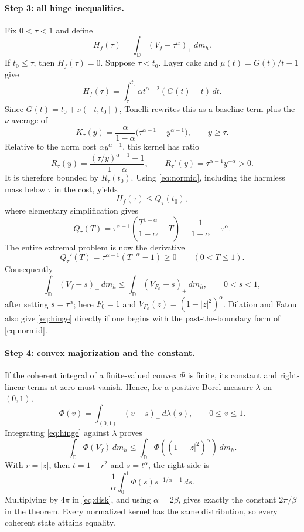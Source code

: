 \documentclass[11pt]{article}
\newcommand{\D}{\mathbb D}
\newcommand{\dd}{\,d}
\begin{document}
\paragraph{Step 3: all hinge inequalities.}
Fix $0<\tau<1$ and define
\[
 H_f(\tau)=\int_\D(V_f-\tau^\alpha)_+\dd m_h.
\]
If $t_0\leq\tau$, then $H_f(\tau)=0$.  Suppose $\tau<t_0$.  Layer cake and
$\mu(t)=G(t)/t-1$ give
\begin{equation}\label{eq:layer}
 H_f(\tau)=\int_\tau^{t_0}\alpha t^{\alpha-2}(G(t)-t)\dd t.
\end{equation}
Since $G(t)=t_0+\nu([t,t_0])$, Tonelli rewrites this as a baseline term plus
the $\nu$-average of
\[
 K_\tau(y)=\frac{\alpha}{1-\alpha}
 \bigl(\tau^{\alpha-1}-y^{\alpha-1}\bigr),\qquad y\geq\tau.
\]
Relative to the norm cost $\alpha y^{\alpha-1}$, this kernel has ratio
\[
 R_\tau(y)=\frac{(\tau/y)^{\alpha-1}-1}{1-\alpha},
 \qquad R_\tau'(y)=\tau^{\alpha-1}y^{-\alpha}>0.
\]
It is therefore bounded by $R_\tau(t_0)$.  Using \eqref{eq:normid}, including
the harmless mass below $\tau$ in the cost, yields
\[
 H_f(\tau)\leq Q_\tau(t_0),
\]
where elementary simplification gives
\begin{equation}\label{eq:Q}
 Q_\tau(T)=\tau^{\alpha-1}
 \left(\frac{T^{1-\alpha}}{1-\alpha}-T\right)
 -\frac1{1-\alpha}+\tau^\alpha.
\end{equation}
The entire extremal problem is now the derivative
\[
 Q_\tau'(T)=\tau^{\alpha-1}(T^{-\alpha}-1)\geq0
 \qquad(0<T\leq1).
\]
Consequently
\begin{equation}\label{eq:hinge}
 \int_\D(V_f-s)_+\dd m_h
 \leq \int_\D(V_{F_0}-s)_+\dd m_h,
 \qquad 0<s<1,
\end{equation}
after setting $s=\tau^\alpha$; here $F_0=1$ and
$V_{F_0}(z)=(1-|z|^2)^\alpha$.  Dilation and Fatou also give
\eqref{eq:hinge} directly if one begins with the past-the-boundary form of
\eqref{eq:normid}.

\newpage
\paragraph{Step 4: convex majorization and the constant.}
If the coherent integral of a finite-valued convex $\Phi$ is finite, its
constant and right-linear terms at zero must vanish.  Hence, for a positive
Borel measure $\lambda$ on $(0,1)$,
\[
 \Phi(v)=\int_{(0,1)}(v-s)_+\dd\lambda(s),\qquad 0\leq v\leq1.
\]
Integrating \eqref{eq:hinge} against $\lambda$ proves
\[
 \int_\D\Phi(V_f)\dd m_h
 \leq\int_\D\Phi((1-|z|^2)^\alpha)\dd m_h.
\]
With $r=|z|$, then $t=1-r^2$ and $s=t^\alpha$, the right side is
\[
 \frac1\alpha\int_0^1\Phi(s)s^{-1/\alpha-1}\dd s.
\]
Multiplying by $4\pi$ in \eqref{eq:disk}, and using $\alpha=2\beta$, gives
exactly the constant $2\pi/\beta$ in the theorem.  Every normalized kernel
has the same distribution, so every coherent state attains equality.
\end{document}
